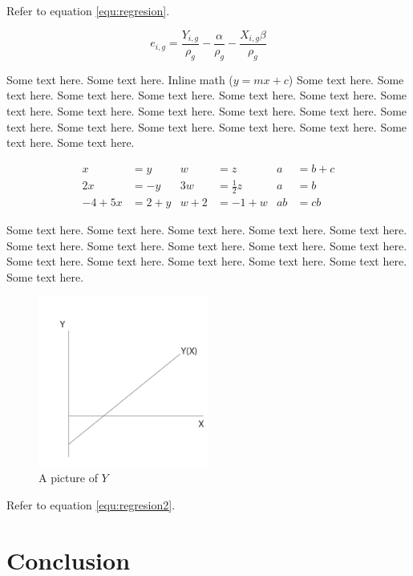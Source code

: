 \documentclass[11pt,twoside]{article}
\theoremstyle{plain}
\theoremstyle{definition}
\theoremstyle{remark}
\begin{document}
Refer to equation \ref{equ:regresion}.


\begin{equation} \label{equ:regresion2}
  e_{i,g} = \frac{Y_{i,g}}{\rho_{g}} - \frac{\alpha}{\rho_{g}} - \frac{X_{i,g} \beta}{\rho_{g}}
\end{equation}


Some text here. Some text here. Inline math ($y = mx + c$)
Some text here. Some text here.
Some text here. Some text here. Some text here. Some text here.
Some text here. Some text here. Some text here. Some text here.
Some text here. Some text here. Some text here. Some text here.
Some text here. Some text here. Some text here. Some text here.

\begin{align*}
x&=y           &  w &=z              &  a&=b+c\\
2x&=-y         &  3w&=\frac{1}{2}z   &  a&=b\\
-4 + 5x&=2+y   &  w+2&=-1+w          &  ab&=cb
\end{align*}


Some text here. Some text here. Some text here. Some text here.
Some text here. Some text here. Some text here. Some text here.
Some text here. Some text here. Some text here. Some text here.
Some text here. Some text here. Some text here. Some text here.


\begin{figure}[ht!]
  \caption{A picture of $Y$}
  \centering
    \includegraphics[width=0.5\textwidth]{sample-figure}
\end{figure}


Refer to equation \ref{equ:regresion2}.




\section{Conclusion} %
\label{sec:conclusion}
\end{document}
